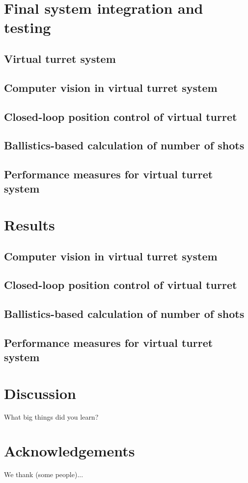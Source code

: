 \documentclass{article}
\begin{document}






\section{Final system integration and testing}
\subsection{Virtual turret system}
\subsection{Computer vision in virtual turret system}
\subsection{Closed-loop position control of virtual turret}
\subsection{Ballistics-based calculation of number of shots}
\subsection{Performance measures for virtual turret system}

\section{Results}
\subsection{Computer vision in virtual turret system}
\subsection{Closed-loop position control of virtual turret}
\subsection{Ballistics-based calculation of number of shots}
\subsection{Performance measures for virtual turret system}

\section{Discussion}
What big things did you learn? 

\section{Acknowledgements}
We thank (some people)...



\appendix

\end{document}

